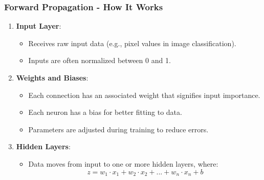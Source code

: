 \documentclass[aspectratio=169]{beamer}
\begin{document}
\begin{frame}[fragile]
    \frametitle{Forward Propagation - How It Works}
    \begin{enumerate}
        \item \textbf{Input Layer}:
            \begin{itemize}
                \item Receives raw input data (e.g., pixel values in image classification).
                \item Inputs are often normalized between 0 and 1.
            \end{itemize}
        \item \textbf{Weights and Biases}:
            \begin{itemize}
                \item Each connection has an associated weight that signifies input importance.
                \item Each neuron has a bias for better fitting to data.
                \item Parameters are adjusted during training to reduce errors.
            \end{itemize}
        \item \textbf{Hidden Layers}:
            \begin{itemize}
                \item Data moves from input to one or more hidden layers, where:
                \begin{equation}
                    z = w_1 \cdot x_1 + w_2 \cdot x_2 + ... + w_n \cdot x_n + b
                \end{equation}
            \end{itemize}
    \end{enumerate}
\end{frame}
\end{document}
